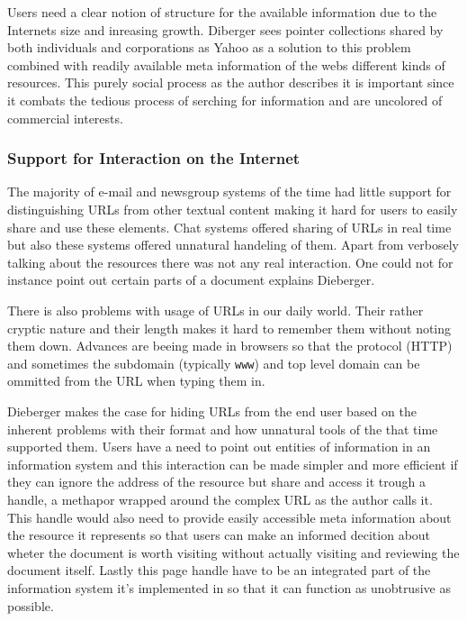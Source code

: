 \documentclass[12pt,a4paper]{article}
\begin{document}
Users need a clear notion of structure for the available information due to
the Internets size and inreasing growth. Diberger sees pointer collections
shared by both individuals and corporations as Yahoo as a solution to this
problem combined with readily available meta information of the webs
different kinds of resources. This purely social process as the author
describes it is important since it combats the tedious process of serching for
information and are uncolored of commercial interests.

\subsubsection{Support for Interaction on the Internet}

The majority of e-mail and newsgroup systems of the time had little support
for distinguishing URLs from other textual content making it hard for users to
easily share and use these elements. Chat systems offered sharing of URLs in
real time but also these systems offered unnatural handeling of them.
Apart from verbosely talking about the resources there was not any real
interaction. One could not for instance point out certain parts of a document
explains Dieberger.

There is also problems with usage of URLs in our daily world. Their rather
cryptic nature and their length makes it hard to remember them without noting
them down. Advances are beeing made in browsers so that the protocol (HTTP)
and sometimes the subdomain (typically \texttt{www}) and top level domain can
be ommitted from the URL when typing them in.

Dieberger makes the case for hiding URLs from the end user based on the
inherent problems with their format and how unnatural tools of the that time
supported them. Users have a need to point out entities of information in an
information system and this interaction can be made simpler and more efficient
if they can ignore the address of the resource but share and access it trough
a handle, a methapor wrapped around the complex URL as the author calls it.
This handle would also need to provide easily accessible meta information
about the resource it represents so that users can make an informed decition
about wheter the document is worth visiting without actually visiting and
reviewing the document itself. Lastly this page handle have to be an
integrated part of the information system it's implemented in so that it
can function as unobtrusive as possible.
\end{document}
